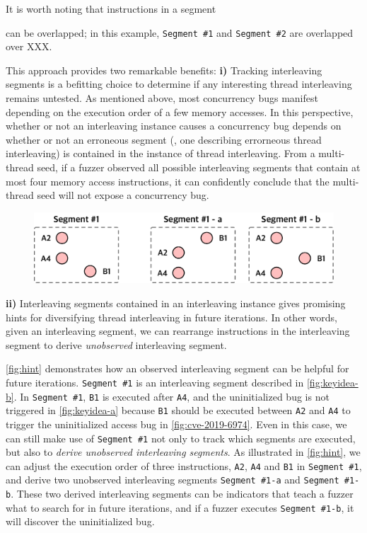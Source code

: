 It is worth noting that instructions in a segment \dr{}

can be overlapped; in this example,
\texttt{Segment \#1} and \texttt{Segment \#2} are overlapped over XXX.




%
This approach provides two remarkable benefits:
%
\textbf{i)} Tracking interleaving segments is a befitting choice to
determine if any interesting thread interleaving remains untested.
%
As mentioned above, most concurrency bugs manifest depending on the
execution order of a few memory accesses.
%
In this perspective, whether or not an interleaving instance causes a
concurrency bug depends on whether or not an erroneous segment (\ie,
one describing errorneous thread interleaving) is contained in the
instance of thread interleaving.
%
From a multi-thread seed, if a fuzzer observed all possible
interleaving segments that contain at most four memory access
instructions, it can confidently conclude that the multi-thread seed
will not expose a concurrency bug.
%


\begin{figure}[t]
  \centering
  \includegraphics[width=0.9\linewidth]{fig/hint.pdf}
  \caption{}
  \label{fig:hint}
\end{figure}
%
\textbf{ii)} Interleaving segments contained in an interleaving
instance gives promising hints for diversifying thread interleaving in
future iterations.
%
In other words, given an interleaving segment, we can rearrange
instructions in the interleaving segment to derive \textit{unobserved}
interleaving segment.

\autoref{fig:hint} demonstrates how an observed interleaving segment
can be helpful for future iterations.
%
\texttt{Segment \#1} is an interleaving segment described in
\autoref{fig:keyidea-b}.
%
In \texttt{Segment \#1}, \texttt{B1} is executed after \texttt{A4},
and the uninitialized bug is not triggered in \autoref{fig:keyidea-a}
because \texttt{B1} should be executed between \texttt{A2} and
\texttt{A4} to trigger the uninitialized access bug in
\autoref{fig:cve-2019-6974}.
%
Even in this case, we can still make use of \texttt{Segment \#1} not
only to track which segments are executed, but also to \textit{derive
  unobserved interleaving segments}.
%
As illustrated in \autoref{fig:hint}, we can adjust the execution
order of three instructions, \texttt{A2}, \texttt{A4} and \texttt{B1}
in \texttt{Segment \#1}, and derive two unobserved interleaving
segments \texttt{Segment \#1-a} and \texttt{Segment \#1-b}.
%
These two derived interleaving segments can be indicators that teach a
fuzzer what to search for in future iterations, and if a fuzzer
executes \texttt{Segment \#1-b}, it will discover the uninitialized
bug.




